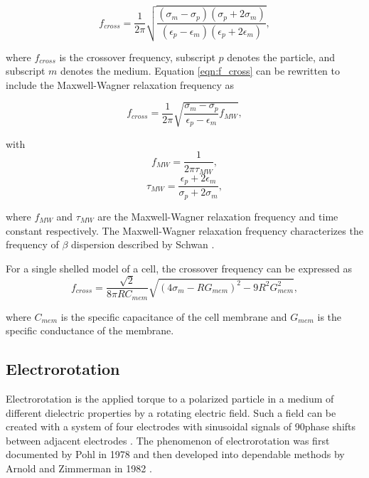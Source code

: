  \begin{equation}
     f_{cross} = \frac{1}{2 \pi}\sqrt{\frac{(\sigma_m-\sigma_p)(\sigma_p+2\sigma_m)}{(\epsilon_p-\epsilon_m)(\epsilon_p+2\epsilon_m)}},
     \label{eqn:f_cross}
 \end{equation}
  
 \noindent where $f_{cross}$ is the crossover frequency, subscript $p$ denotes the particle, and subscript $m$ denotes the medium. Equation \ref{eqn:f_cross} can be rewritten to include the Maxwell-Wagner relaxation frequency as \cite{morgan_single_2007}
 
 \begin{equation}
    f_{cross} = \frac{1}{2 \pi} \sqrt{\frac{\sigma_m - \sigma_p}{\epsilon_p - \epsilon_m}f_{MW}},
 \end{equation}
 
 \noindent with
\begin{equation}
    f_{MW} = \frac{1}{2\pi\tau_{MW}},
\end{equation}
\begin{equation}
    \tau_{MW} = \frac{\epsilon_p + 2\epsilon_m}{\sigma_p + 2\sigma_m},
\end{equation}
 
 \noindent where $f_{MW}$ and $\tau_{MW}$ are the Maxwell-Wagner relaxation frequency and time constant respectively. The Maxwell-Wagner relaxation frequency characterizes the frequency of $\beta$ dispersion described by Schwan \cite{morgan_single_2007}.
 
 \par For a single shelled model of a cell, the crossover frequency can be expressed as
 \begin{equation}
     f_{cross} = \frac{\sqrt{2}}{8\pi R C_{mem}}\sqrt{(4\sigma_m - RG_{mem})^2 - 9R^2G^2_{mem}},
 \end{equation}
 
 \noindent where $C_{mem}$ is the specific capacitance of the cell membrane and $G_{mem}$ is the specific conductance of the membrane.
 
 \subsection{Electrorotation}
 
 \par Electrorotation is the applied torque to a polarized particle in a medium of different dielectric properties by a rotating electric field. Such a field can be created with a system of four electrodes with sinusoidal signals of 90\textdegree \;phase shifts between adjacent electrodes \cite{goater_electrorotation_1999}. The phenomenon of electrorotation was first documented by Pohl in 1978 and then developed into dependable methods by Arnold and Zimmerman in 1982 \cite{pohl_dielectrophoresis_1978-1, arnold_rotating-field-induced_1982}.
 
